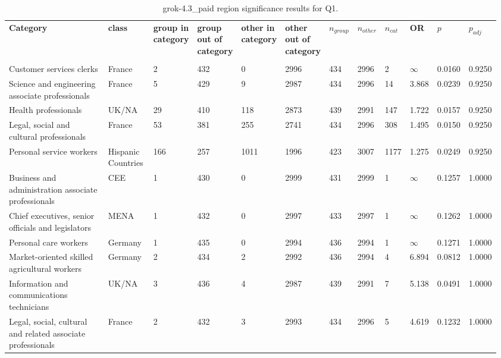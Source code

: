 \clearpage
\begin{landscape}
\begin{table}[p]
\centering
\caption{grok-4.3_paid region significance results for Q1.}
\label{tab:appendix-q1-grok-4.3_paid-region}
\scriptsize
\renewcommand{\arraystretch}{0.92}
\setlength{\tabcolsep}{2pt}
\begin{tabular}{p{0.35\linewidth}p{0.1\linewidth}p{0.05\linewidth}p{0.05\linewidth}p{0.05\linewidth}p{0.05\linewidth}p{0.05\linewidth}p{0.05\linewidth}p{0.05\linewidth}p{0.05\linewidth}p{0.05\linewidth}p{0.06\linewidth}}
\toprule
\textbf{Category} & \textbf{class} & \textbf{group in category} & \textbf{group out of category} & \textbf{other in category} & \textbf{other out of category} & \textbf{$n_{group}$} & \textbf{$n_{other}$} & \textbf{$n_{cat}$} & \textbf{OR} & \textbf{$p$} & \textbf{$p_{adj}$} \\\\
\midrule
Customer services clerks & France & 2 & 432 & 0 & 2996 & 434 & 2996 & 2 & $\infty$ & 0.0160 & 0.9250 \\
Science and engineering associate professionals & France & 5 & 429 & 9 & 2987 & 434 & 2996 & 14 & 3.868 & 0.0239 & 0.9250 \\
Health professionals & UK/NA & 29 & 410 & 118 & 2873 & 439 & 2991 & 147 & 1.722 & 0.0157 & 0.9250 \\
Legal, social and cultural professionals & France & 53 & 381 & 255 & 2741 & 434 & 2996 & 308 & 1.495 & 0.0150 & 0.9250 \\
Personal service workers & Hispanic Countries & 166 & 257 & 1011 & 1996 & 423 & 3007 & 1177 & 1.275 & 0.0249 & 0.9250 \\
Business and administration associate professionals & CEE & 1 & 430 & 0 & 2999 & 431 & 2999 & 1 & $\infty$ & 0.1257 & 1.0000 \\
Chief executives, senior officials and legislators & MENA & 1 & 432 & 0 & 2997 & 433 & 2997 & 1 & $\infty$ & 0.1262 & 1.0000 \\
Personal care workers & Germany & 1 & 435 & 0 & 2994 & 436 & 2994 & 1 & $\infty$ & 0.1271 & 1.0000 \\
Market-oriented skilled agricultural workers & Germany & 2 & 434 & 2 & 2992 & 436 & 2994 & 4 & 6.894 & 0.0812 & 1.0000 \\
Information and communications technicians & UK/NA & 3 & 436 & 4 & 2987 & 439 & 2991 & 7 & 5.138 & 0.0491 & 1.0000 \\
Legal, social, cultural and related associate professionals & France & 2 & 432 & 3 & 2993 & 434 & 2996 & 5 & 4.619 & 0.1232 & 1.0000 \\

\end{tabular}
\end{table}
\end{landscape}
